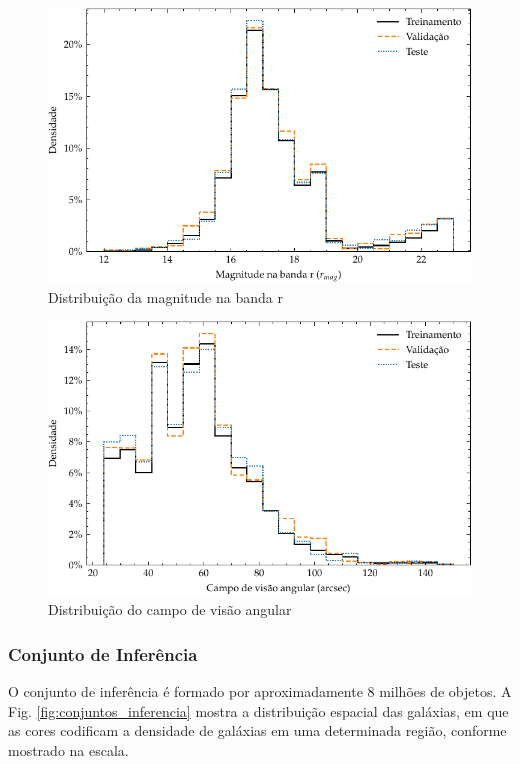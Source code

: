 \begin{figure}[!ht]
  \centering
  \caption{Distribuição da magnitude na banda r}
  \label{fig:conjuntos_magr}
  \includegraphics[width=\linewidth]{notebooks/plots/conjuntos_magr.pdf}
\end{figure}


\begin{figure}[!ht]
  \centering
  \caption{Distribuição do campo de visão angular}
  \label{fig:conjuntos_fov}
  \includegraphics[width=\linewidth]{notebooks/plots/conjuntos_fov.pdf}
\end{figure}


\subsubsection{Conjunto de Inferência}
\label{sec:aquisicao-inferencia}

O conjunto de inferência é formado por aproximadamente 8 milhões de objetos. A Fig. \ref{fig:conjuntos_inferencia} mostra a distribuição espacial das galáxias, em que as cores codificam a densidade de galáxias em uma determinada região, conforme mostrado na escala.

